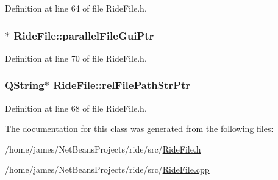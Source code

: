 Definition at line 64 of file Ride\-File.\-h.

\hypertarget{class_ride_file_ab2a6a17fda833b6e592968cde2aa18dc}{
\subsubsection[{parallel\-File\-Gui\-Ptr}]{$\ast$ Ride\-File\-::parallel\-File\-Gui\-Ptr\hspace{0.3cm}{\ttfamily [private]}}}\label{class_ride_file_ab2a6a17fda833b6e592968cde2aa18dc}


Definition at line 70 of file Ride\-File.\-h.

\hypertarget{class_ride_file_a47152ef70bd5486c4cbaa5c12e5346d4}{
\subsubsection[{rel\-File\-Path\-Str\-Ptr}]{\setlength{\rightskip}{0pt plus 5cm}Q\-String$\ast$ Ride\-File\-::rel\-File\-Path\-Str\-Ptr\hspace{0.3cm}{\ttfamily [private]}}}\label{class_ride_file_a47152ef70bd5486c4cbaa5c12e5346d4}


Definition at line 68 of file Ride\-File.\-h.



The documentation for this class was generated from the following files\-:\begin{DoxyCompactItemize}
\item 
/home/james/\-Net\-Beans\-Projects/ride/src/\hyperlink{_ride_file_8h}{Ride\-File.\-h}\item 
/home/james/\-Net\-Beans\-Projects/ride/src/\hyperlink{_ride_file_8cpp}{Ride\-File.\-cpp}\end{DoxyCompactItemize}
